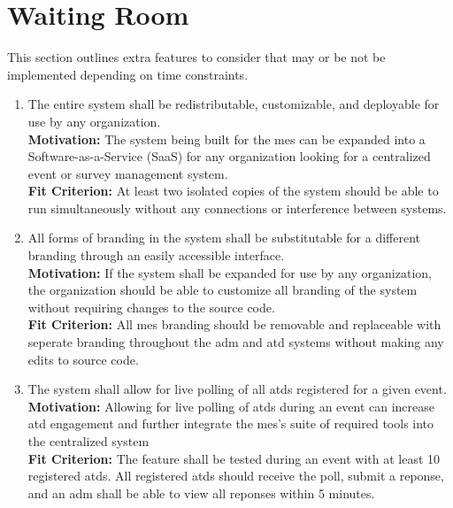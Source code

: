 \documentclass[12pt]{article}
\begin{document}
\section{Waiting Room}

This section outlines extra features to consider that may or be not be implemented depending on time constraints.

\begin{enumerate}[align=left,
  leftmargin=*,
  labelsep=1em,
  itemindent=0em,
  label=\bfseries WR-\arabic*:,
  ref=\bfseries WR-\arabic*]
  \item \label{WR1} The entire system shall be redistributable, customizable, and deployable for use by any organization. \\[2mm]
    {\bf Motivation:} The system being built for the \gls{mes} can be expanded into a Software-as-a-Service (SaaS) for any organization looking for a centralized event or survey management system. \\
    {\bf Fit Criterion:} At least two isolated copies of the system should be able to run simultaneously without any connections or interference between systems.
  
  \item \label{WR2} All forms of branding in the system shall be substitutable for a different branding through an easily accessible interface.\\[2mm]
  {\bf Motivation:} If the system shall be expanded for use by any organization, the organization should be able to customize all branding of the system without requiring changes to the source code.\\
  {\bf Fit Criterion:} All \gls{mes} branding should be removable and replaceable with seperate branding throughout the \gls{adm} and \gls{atd} systems without making any edits to source code.

  \item \label{WR3} The system shall allow for live polling of all \glspl{atd} registered for a given event. \\[2mm]
  {\bf Motivation:} Allowing for live polling of \glspl{atd} during an event can increase \gls{atd} engagement and further integrate the \gls{mes}'s suite of required tools into the centralized system\\
  {\bf Fit Criterion:} The feature shall be tested during an event with at least 10 registered \glspl{atd}. All registered \glspl{atd} should receive the poll, submit a reponse, and an \gls{adm} shall be able to view all reponses within 5 minutes.


\end{enumerate}
\end{document}
